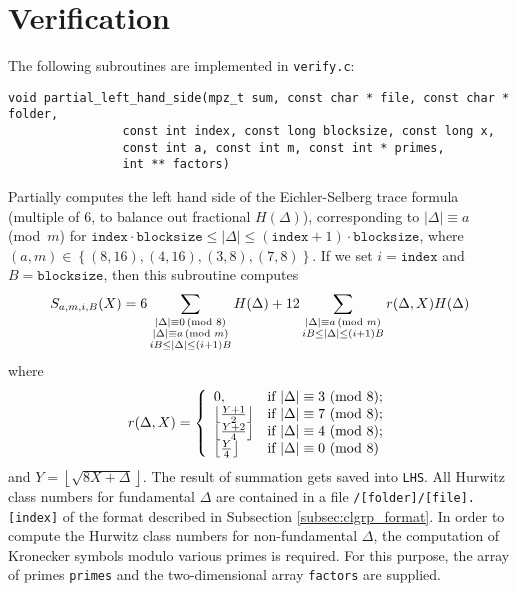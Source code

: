 \documentclass[a4paper,10pt]{article}
\newcommand{\code}{\lstinline}
\begin{document}
\section{Verification} \label{subsec:verification}

The following subroutines are implemented in \code{verify.c}:

\begin{lstlisting}
void partial_left_hand_side(mpz_t sum, const char * file, const char * folder,
			    const int index, const long blocksize, const long x,
			    const int a, const int m, const int * primes,
			    int ** factors)
\end{lstlisting}

Partially computes the left hand side of the Eichler-Selberg trace formula (multiple of 6, to balance out fractional $H(\Delta)$), corresponding to $|\Delta| \equiv a$ \mbox{(mod $m$)} for $\texttt{index} \cdot \texttt{blocksize} \leq |\Delta| \leq (\texttt{index} + 1) \cdot \texttt{blocksize}$, where $(a, m) \in \left\{(8, 16), (4, 16), (3, 8), (7, 8)\right\}$. If we set $i=\texttt{index}$ and $B = \texttt{blocksize}$, then this subroutine computes
%
$$
S_{a, m, i, B}(X) = 6\sum\limits_{\substack{|\Delta| \equiv 0 \,\textnormal{(mod 8)}\\|\Delta| \equiv a \,\textnormal{(mod $m$)}\\iB \leq |\Delta| \leq (i+1)B}} H(\Delta) + 12\sum\limits_{\substack{|\Delta| \equiv a \,\textnormal{(mod $m$)}\\iB \leq |\Delta| \leq (i+1)B}}r(\Delta, X)H(\Delta)
$$
%
where
%
$$
r(\Delta, X) = \left\{
\begin{array}{l l}
0,							& \textnormal{if $|\Delta| \equiv 3$ (mod 8);}\\
\left\lfloor \frac{Y+1}{2}\right\rfloor	& \textnormal{if $|\Delta| \equiv 7$ (mod 8);}\\
\left\lfloor \frac{Y+2}{4}\right\rfloor	& \textnormal{if $|\Delta| \equiv 4$ (mod 8)};\\
\left\lfloor \frac{Y}{4}\right\rfloor		& \textnormal{if $|\Delta| \equiv 0$ (mod 8)}\\
\end{array}
\right.
$$
%
and $Y = \left\lfloor \sqrt{8X+\Delta} \right\rfloor$. The result of summation gets saved into \code{LHS}. All Hurwitz class numbers for fundamental $\Delta$ are contained in a file \code{/[folder]/[file].[index]} of the format described in Subsection \ref{subsec:clgrp_format}. In order to compute the Hurwitz class numbers for non-fundamental $\Delta$, the computation of Kronecker symbols modulo various primes is required. For this purpose, the array of primes \code{primes} and the two-dimensional array \code{factors} are supplied.
\end{document}

